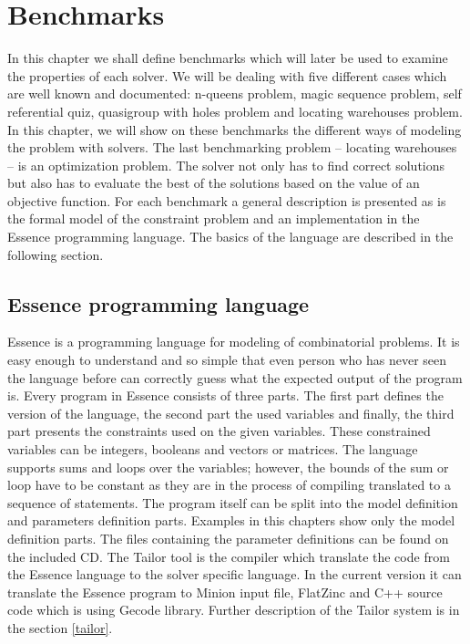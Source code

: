 \chapter{Benchmarks}
\label{benchmarks}

In this chapter we shall define benchmarks which will later be used to examine the properties of each solver. 
We will be dealing with five different cases which are well known and documented: n-queens problem, magic 
sequence problem, self referential quiz, quasigroup with holes problem and locating warehouses problem. 
In this chapter, we will show on these benchmarks the different ways of modeling the problem with solvers.
The last benchmarking problem -- locating warehouses -- is an optimization
problem. The solver not only has to find correct solutions but also has to evaluate the best of the
solutions based on the value of an objective function. For each benchmark 
a general description is presented as is the formal model of the constraint problem and an implementation in
the Essence  programming language. The basics of the language are described in the following 
section.

\section{Essence programming language}
Essence is a programming language for modeling of combinatorial problems. It is 
easy enough to understand and so simple that even person who has never seen the
language before can correctly guess what the expected output of the program is. Every program in Essence 
consists of three parts. The first part defines the version of the language, the second
part the used variables and finally, the third part presents the constraints used on the given 
variables. These constrained variables can be integers, booleans and vectors or matrices.
The language supports sums and loops over the variables; however, the bounds of the
sum or loop have to be constant as they are in the process of compiling translated
to a sequence of statements. The program itself can be split into the model definition
and parameters definition parts. Examples in this chapters show only the model 
definition parts. The files containing the parameter definitions can be found on the included CD.
The Tailor tool is the compiler which translate the code from the Essence language to 
the solver specific language. In the current version it can translate the Essence program to Minion 
input file, FlatZinc and C++ source code which is using Gecode library. Further description of
the Tailor system is in the section \ref{tailor}.

